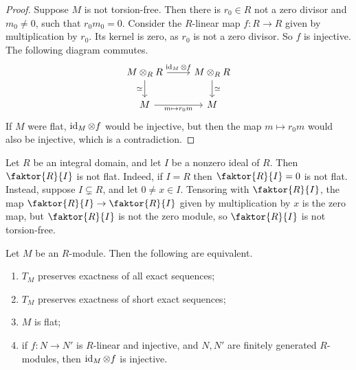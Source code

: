 \begin{proof}
    Suppose \( M \) is not torsion-free.
    Then there is \( r_0 \in R \) not a zero divisor and \( m_0 \neq 0 \), such that \( r_0 m_0 = 0 \).
    Consider the \( R \)-linear map \( f : R \to R \) given by multiplication by \( r_0 \).
    Its kernel is zero, as \( r_0 \) is not a zero divisor.
    So \( f \) is injective.
    The following diagram commutes.
\[\begin{tikzcd}
	{M \otimes_R R} & {M \otimes_R R} \\
	M & M
	\arrow["{\id_M \otimes f}", from=1-1, to=1-2]
	\arrow["\simeq", from=1-2, to=2-2]
	\arrow["\simeq"', from=1-1, to=2-1]
	\arrow["{m \mapsto r_0 m}"', from=2-1, to=2-2]
\end{tikzcd}\]
    If \( M \) were flat, \( \operatorname{id}_M \otimes f \) would be injective, but then the map \( m \mapsto r_0 m \) would also be injective, which is a contradiction.
\end{proof}
\begin{example}
    Let \( R \) be an integral domain, and let \( I \) be a nonzero ideal of \( R \).
    Then \( \faktor{R}{I} \) is not flat.
    Indeed, if \( I = R \) then \( \faktor{R}{I} = 0 \) is not flat.
    Instead, suppose \( I \subsetneq R \), and let \( 0 \neq x \in I \).
    Tensoring with \( \faktor{R}{I} \), the map \( \faktor{R}{I} \to \faktor{R}{I} \) given by multiplication by \( x \) is the zero map, but \( \faktor{R}{I} \) is not the zero module, so \( \faktor{R}{I} \) is not torsion-free.
\end{example}
\begin{proposition}
    Let \( M \) be an \( R \)-module.
    Then the following are equivalent.
    \begin{enumerate}
        \item \( T_M \) preserves exactness of all exact sequences;
        \item \( T_M \) preserves exactness of short exact sequences;
        \item \( M \) is flat;
        \item if \( f : N \to N' \) is \( R \)-linear and injective, and \( N, N' \) are finitely generated \( R \)-modules, then \( \operatorname{id}_M \otimes f \) is injective.
    \end{enumerate}
\end{proposition}
